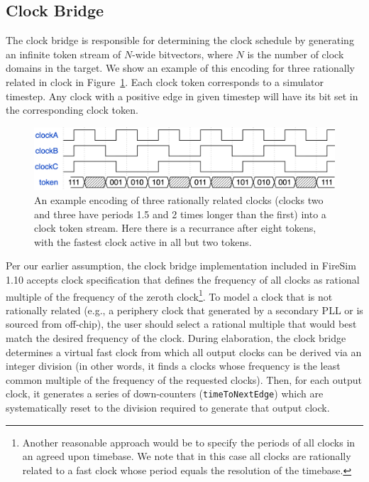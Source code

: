 \subsection{Clock Bridge}

The clock bridge is responsible for determining the clock schedule by
generating an infinite token stream of $N$-wide bitvectors, where $N$ is the
number of clock domains in the target. We show an example of this encoding for three rationally
related in clock in Figure~\ref{fig:clock-token}. Each clock token corresponds to a
simulator timestep. Any clock with a positive edge in given timestep will have
its bit set in the corresponding clock token.

\begin{figure}
    \centering
    \includegraphics[width=\textwidth]{figures/clock-token.png}
    \caption{An example encoding of three rationally related clocks (clocks two and three have periods
    1.5 and 2 times longer than the first) into a clock token stream. Here there is a recurrance
    after eight tokens, with the fastest clock active in all but two tokens.}
    \label{fig:clock-token}
\end{figure}

Per our earlier assumption, the clock bridge implementation included in FireSim 1.10 accepts clock specification that
defines the frequency of all clocks as rational multiple of the
frequency of the zeroth clock\footnote{Another reasonable approach would be to
specify the periods of all clocks in an agreed upon timebase. We note
that in this case all clocks are rationally related to a fast clock whose
period equals the resolution of the timebase.}. To model a clock that is not
rationally related (e.g., a periphery clock that generated by a
secondary PLL or is sourced from off-chip), the user should select a rational
multiple that would best match the desired frequency of the clock.  During
elaboration, the clock bridge determines a virtual fast clock from which all
output clocks can be derived via an integer division (in other words, it finds
a clocks whose frequency is the least common multiple of the frequency of the
requested clocks). Then, for each output clock, it generates a series of
down-counters (\texttt{timeToNextEdge}) which are systematically reset to the
division required to generate that output clock.

